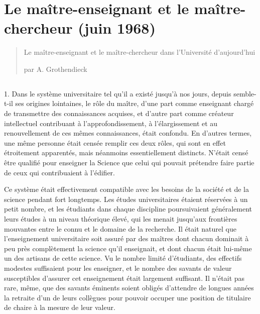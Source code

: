 \documentclass[11pt,a4paper]{article}
\begin{document}
\section*{Le maître-enseignant et le maître-chercheur (juin 1968)}


\begin{quote}
Le maître-enseignant et le maître-chercheur dans l'Université d'aujourd'hui 

par A. Grothendieck
\end{quote}

\subsection*{}

1. Dans le système universitaire tel qu'il a existé jusqu'à nos jours,
depuis semble-t-il ses origines lointaines, le rôle du maître, d'une part
comme enseignant chargé de transmettre des connaissances acquises, et
d'autre part comme créateur intellectuel contribuant à l'approfondissement,
à l'élargissement et au renouvellement de ces mêmes connaissances, était
confondu. En d'autres termes, une même personne était censée remplir ces
deux rôles, qui sont en effet étroitement apparentés, mais néanmoins
essentiellement distincts. N'était censé être qualifié pour enseigner la Science
que celui qui pouvait prétendre faire partie de ceux qui contribuaient à
l'édifier.

Ce système était effectivement compatible avec les besoins de la
société et de la science pendant fort longtemps. Les études universitaires
étaient réservées à un petit nombre, et les étudiants dans chaque discipline
poursuivaient généralement leurs études à un niveau théorique élevé, qui
les menait jusqu'aux frontières mouvantes entre le connu et le domaine de
la recherche. Il était naturel que l'enseignement universitaire soit assuré
par des maîtres dont chacun dominait à peu près complètement la science qu'il
enseignait, et dont chacun était lui-même un des artisans de cette science.
Vu le nombre limité d'étudiants, des effectifs modestes suffisaient pour
les enseigner, et le nombre des savants de valeur susceptibles d'assurer
cet enseignement était largement suffisant. Il n'était pas rare, même, que
des savants éminents soient obligés d'attendre de longues années la retraite
d'un de leurs collègues pour pouvoir occuper une position de titulaire de
chaire à la mesure de leur valeur.
\end{document}
